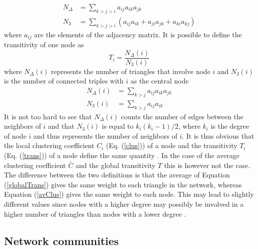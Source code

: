 \documentclass[11 pt , letterpaper , twoside , openright]{book}
\begin{document}
\begin{align}
	N_{\Delta} &= \sum_{k > j > i} a_{ij}a_{ik}a_{jk} \\
	N_3 &= \sum_{k > j > i} (a_{ij}a_{ik} + a_{ji}a_{jk} + a_{ki}a_{kj})
\end{align}
where $a_{ij}$ are the elements of the adjacency matrix. It is possible to define the transitivity of one node as \cite{F.Costa2007}
\begin{equation}\label{trans}
	T_i = \frac{N_{\Delta}(i)}{N_3(i)}
\end{equation}
where $N_{\Delta}(i)$ represents the number of triangles that involve node $i$ and $N_3(i)$ is the number of connected triples with $i$ as the central node \cite{F.Costa2007}
\begin{align}
	N_{\Delta}(i) &= \sum_{k > j} a_{ij}a_{ik}a_{jk} \\
	N_3(i) &= \sum_{k > j} a_{ij}a_{ik}
\end{align}
It is not too hard to see that $N_{\Delta}(i)$ counts the number of edges between the neighbors of $i$ and that $N_3(i)$ is equal to $k_i(k_i-1)/2$, where $k_i$ is the degree of node $i$ and thus represents the number of neighbors of $i$. It is thus obvious that the local clustering coefficient $C_i$ (Eq. (\ref{clus})) of a node and the transitivity $T_i$ (Eq. (\ref{trans})) of a node define the same quantity \cite{F.Costa2007}. In the case of the average clustering coefficient $\bar{C}$ and the global transitivity $T$ this is however not the case. The difference between the two definitions is that the average of Equation (\ref{globalTrans}) gives the same weight to each triangle in the network, whereas Equation (\ref{avClus}) gives the same weight to each node. This may lead to slightly different values since nodes with a higher degree may possibly be involved in a higher number of triangles than nodes with a lower degree \cite{F.Costa2007}.
	
\subsection{Network communities}

\end{document}
